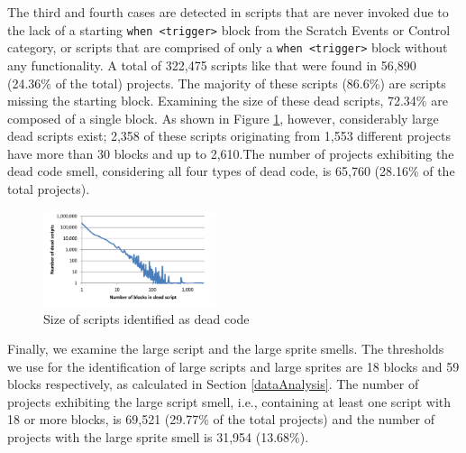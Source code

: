 \documentclass{sig-alternate}
\begin{document}
The third and fourth cases are detected in scripts that are never invoked due to the lack of a starting \texttt{when <trigger>} block from the Scratch Events or Control category, or scripts that are comprised of only a \texttt{when <trigger>} block without any functionality. A total of 322,475 scripts like that were found in 56,890 (24.36\% of the total) projects. The majority of these scripts (86.6\%) are scripts missing the starting block. Examining the size of these dead scripts, 72.34\% are composed of a single block. As shown in Figure \ref{fig:deadcode}, however, considerably large dead scripts exist; 2,358 of these scripts originating from 1,553 different projects have more than 30 blocks and up to 2,610.\footnotemark[\ref{repo}] The number of projects exhibiting the dead code smell, considering all four types of dead code, is 65,760 (28.16\% of the total projects).

\begin{figure}
	\centering
	\includegraphics[width=0.45\textwidth]{fig/charts/12deadcode}
	\caption{Size of scripts identified as dead code}
	\label{fig:deadcode}
\end{figure}

Finally, we examine the large script and the large sprite smells. The thresholds we use for the identification of large scripts and large sprites are 18 blocks and 59 blocks respectively, as calculated in Section \ref{dataAnalysis}. The number of projects exhibiting the large script smell, i.e., containing at least one script with 18 or more blocks, is 69,521 (29.77\% of the total projects) and the number of projects with the large sprite smell is 31,954 (13.68\%).

\noindent
{}
\end{document}
